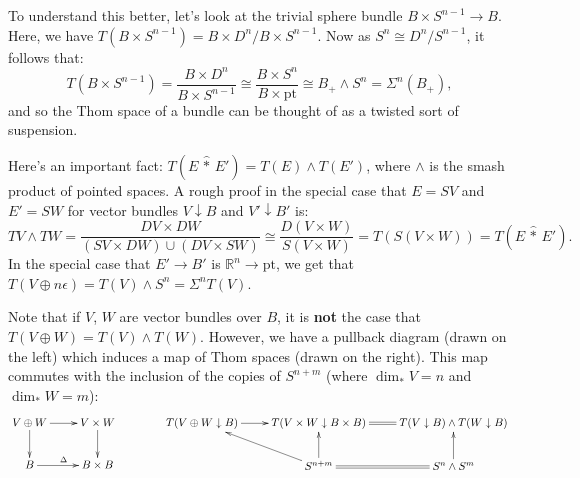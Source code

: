 \documentclass{article}
\newcommand{\R}{\mathbb{R}}
\newcommand{\sprod}{\wedge}
\newcommand{\wsum}{\vee}
\newcommand{\pt}[1]{#1_+}
\newcommand{\ptspace}{\mathrm{pt}}
\newcommand{\Suspend}{\Sigma}
\begin{document}
To understand this better, let's look at the trivial sphere bundle $B \times S^{n-1} \to B$.  Here, we have $T(B \times S^{n-1}) = B \times D^n / B \times S^{n-1}$.  Now as $S^n\cong D^n/S^{n-1}$, it follows that:
\[T(B \times S^{n-1}) = \frac{B \times D^n}{B \times S^{n-1}} \cong \frac{B \times S^n}{B \times \ptspace} \cong \pt{B} \sprod S^n = \Suspend^n(\pt{B}),\]
and so the Thom space of a bundle can be thought of as a twisted sort of suspension.

Here's an important fact: $T(E\, \widehat \ast\, E') = T(E) \sprod T(E')$, where $\sprod$ is the smash product of pointed spaces.  A rough proof in the special case that $E = SV$ and $E' = SW$ for vector bundles $V\downarrow B$ and $V'\downarrow B'$ is:
\[TV \sprod TW = \frac{DV \times DW}{(SV \times DW) \cup (DV \times SW)}\cong \frac{D(V \times W)}{S(V \times W)}= T(S(V \times W)) = T(E\,\widehat \ast\, E').\]
In the special case that $E' \to B'$ is $\R^n \to \ptspace$, we get that $T(V \oplus n \epsilon) = T(V) \sprod S^n = \Suspend^n T(V)$.

Note that if $V$, $W$ are vector bundles over $B$, it is \textbf{not} the case that $T(V\oplus W)=T(V)\wedge T(W)$. However, we have a pullback diagram (drawn on the left) which induces a map of Thom spaces (drawn on the right). This map commutes with the inclusion of the copies of $S^{n+m}$ (where $\dim_*V=n$ and $\dim_*W=m$):
\[\xymatrix{
V\oplus W\ar[d]\ar[r]&V\times W\ar[d]\\
B\ar[r]^\Delta&B\times B
}\qquad\qquad
\xymatrix{
T(V\oplus W\downarrow B)\ar[r]&T(V\times W\downarrow B\times B)
\ar@{=}[r]&T(V\downarrow B)\wedge T(W\downarrow B)\\
&S^{n+m}\ar[ul]\ar[u]\ar@{=}[r]&S^n\wedge S^{m}\ar[u]
}\]
\end{document}
